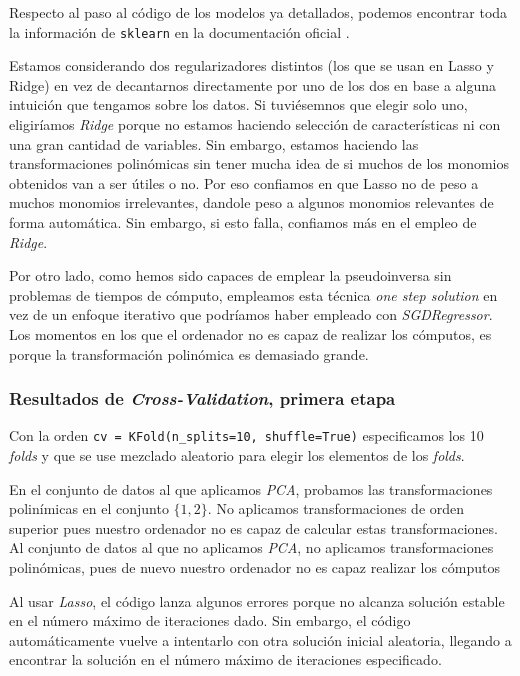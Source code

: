 \documentclass[11pt]{article}
\begin{document}
Respecto al paso al código de los modelos ya detallados, podemos encontrar toda la información de \lstinline{sklearn} en la documentación oficial \cite{sklearn_linear_models_list:online}.

Estamos considerando dos regularizadores distintos (los que se usan en Lasso y Ridge) en vez de decantarnos directamente por uno de los dos en base a alguna intuición que tengamos sobre los datos. Si tuviésemnos que elegir solo uno, eligiríamos \emph{Ridge} porque no estamos haciendo selección de características ni con una gran cantidad de variables. Sin embargo, estamos haciendo las transformaciones polinómicas sin tener mucha idea de si muchos de los monomios obtenidos van a ser útiles o no. Por eso confiamos en que Lasso no de peso a muchos monomios irrelevantes, dandole peso a algunos monomios relevantes de forma automática. Sin embargo, si esto falla, confiamos más en el empleo de \emph{Ridge}.

Por otro lado, como hemos sido capaces de emplear la pseudoinversa sin problemas de tiempos de cómputo, empleamos esta técnica \emph{one step solution} en vez de un enfoque iterativo que podríamos haber empleado con \emph{SGDRegressor}. Los momentos en los que el ordenador no es capaz de realizar los cómputos, es porque la transformación polinómica es demasiado grande.

\subsubsection{Resultados de \emph{Cross-Validation}, primera etapa}

Con la orden \lstinline{cv = KFold(n_splits=10, shuffle=True)} especificamos los 10 \emph{folds} y que se use mezclado aleatorio para elegir los elementos de los \emph{folds}.

En el conjunto de datos al que aplicamos \emph{PCA}, probamos las transformaciones polinímicas en el conjunto $\{1, 2\}$. No aplicamos transformaciones de orden superior pues nuestro ordenador no es capaz de calcular estas transformaciones. Al conjunto de datos al que no aplicamos \emph{PCA}, no aplicamos transformaciones polinómicas, pues de nuevo nuestro ordenador no es capaz realizar los cómputos

Al usar \emph{Lasso}, el código lanza algunos errores porque no alcanza solución estable en el número máximo de iteraciones dado. Sin embargo, el código automáticamente vuelve a intentarlo con otra solución inicial aleatoria, llegando a encontrar la solución en el número máximo de iteraciones especificado.
\end{document}
